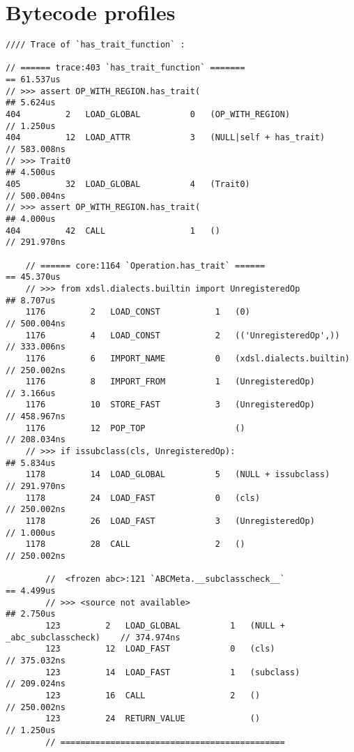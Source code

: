 \appendix

\chapter{Bytecode profiles}
\label{chap:bytecode-profiles}

\begin{code}
    \begin{verbatim}
//// Trace of `has_trait_function` :

// ====== trace:403 `has_trait_function` =======                                == 61.537us
// >>> assert OP_WITH_REGION.has_trait(                                         ## 5.624us
404         2   LOAD_GLOBAL          0   (OP_WITH_REGION)                       // 1.250us
404         12  LOAD_ATTR            3   (NULL|self + has_trait)                // 583.008ns
// >>> Trait0                                                                   ## 4.500us
405         32  LOAD_GLOBAL          4   (Trait0)                               // 500.004ns
// >>> assert OP_WITH_REGION.has_trait(                                         ## 4.000us
404         42  CALL                 1   ()                                     // 291.970ns

    // ====== core:1164 `Operation.has_trait` ======                            == 45.370us
    // >>> from xdsl.dialects.builtin import UnregisteredOp                     ## 8.707us
    1176         2   LOAD_CONST           1   (0)                               // 500.004ns
    1176         4   LOAD_CONST           2   (('UnregisteredOp',))             // 333.006ns
    1176         6   IMPORT_NAME          0   (xdsl.dialects.builtin)           // 250.002ns
    1176         8   IMPORT_FROM          1   (UnregisteredOp)                  // 3.166us
    1176         10  STORE_FAST           3   (UnregisteredOp)                  // 458.967ns
    1176         12  POP_TOP                  ()                                // 208.034ns
    // >>> if issubclass(cls, UnregisteredOp):                                  ## 5.834us
    1178         14  LOAD_GLOBAL          5   (NULL + issubclass)               // 291.970ns
    1178         24  LOAD_FAST            0   (cls)                             // 250.002ns
    1178         26  LOAD_FAST            3   (UnregisteredOp)                  // 1.000us
    1178         28  CALL                 2   ()                                // 250.002ns

        //  <frozen abc>:121 `ABCMeta.__subclasscheck__`                        == 4.499us
        // >>> <source not available>                                           ## 2.750us
        123         2   LOAD_GLOBAL          1   (NULL + _abc_subclasscheck)    // 374.974ns
        123         12  LOAD_FAST            0   (cls)                          // 375.032ns
        123         14  LOAD_FAST            1   (subclass)                     // 209.024ns
        123         16  CALL                 2   ()                             // 250.002ns
        123         24  RETURN_VALUE             ()                             // 1.250us
        // =============================================


\end{verbatim}
\end{code}
